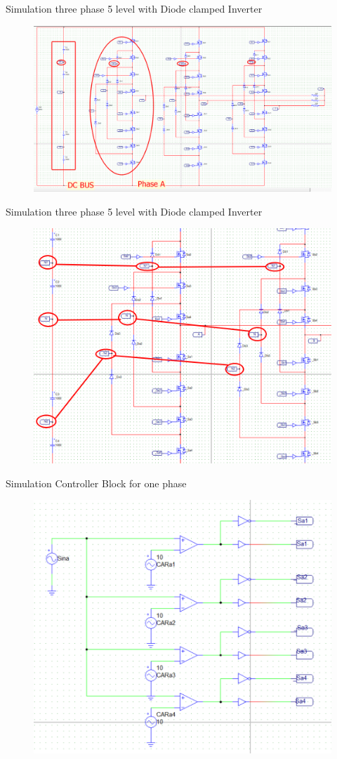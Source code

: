 \documentclass[
	11pt, %
]{beamer}
\begin{document}
\begin{frame}{Simulation three phase 5 level with Diode clamped Inverter}
    \begin{figure}
        \includegraphics[width=1\linewidth]{simulation_Schematic.png}
    \end{figure}
\end{frame}

\begin{frame}{Simulation three phase 5 level with Diode clamped Inverter}
    \begin{figure}
        \includegraphics[width=0.7\linewidth]{simulation2.png}
    \end{figure}
\end{frame}

\begin{frame}{Simulation Controller Block for one phase}
    \begin{figure}
        \includegraphics[width=0.68\linewidth]{Sim3Pw.png}
    \end{figure}
\end{frame}
\end{document}
